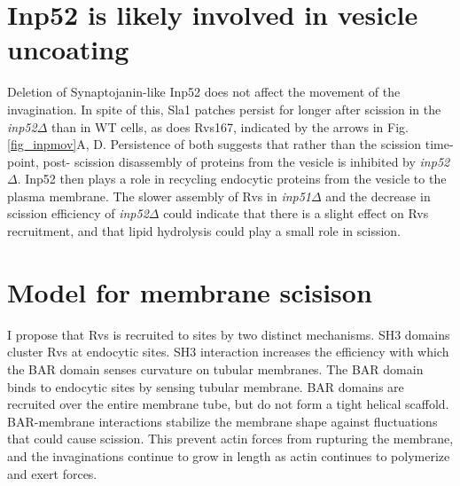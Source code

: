 \section{Inp52 is likely involved in vesicle uncoating}
Deletion of Synaptojanin-like Inp52 does not affect the movement of the invagination. In spite of this, Sla1 patches persist for longer after scission in the \textit{inp52$\Delta$} than in WT cells, as does Rvs167, indicated by the arrows in Fig.\ref{fig_inpmov}A, D. Persistence of both suggests that rather than the scission time-point, post- scission disassembly of proteins from the vesicle is inhibited by \textit{inp52$\Delta$}. Inp52 then plays a role in recycling endocytic proteins from the vesicle to the plasma membrane. The slower assembly of Rvs in \textit{inp51$\Delta$}  and the decrease in scission efficiency of \textit{inp52$\Delta$} could indicate that there is a slight effect on Rvs recruitment, and that lipid hydrolysis could play a small role in scission. 


\newpage
\section{Model for membrane scisison}
I propose that Rvs is recruited to sites by two distinct mechanisms. SH3 domains cluster Rvs at endocytic sites. SH3 interaction increases the efficiency with which the BAR domain senses curvature on tubular membranes. The BAR domain binds to endocytic sites by sensing tubular membrane. BAR domains are recruited over the entire membrane tube, but do not form a tight helical scaffold. BAR-membrane interactions stabilize the membrane shape against fluctuations that could cause scission. This prevent actin forces from rupturing the membrane, and the invaginations continue to grow in length as actin continues to polymerize and exert forces. 



